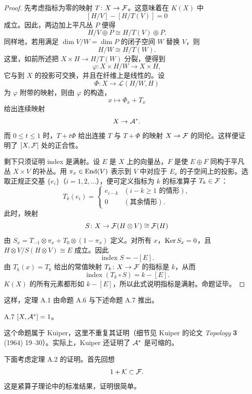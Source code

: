 \begin{proof}
  先考虑指标为零的映射 $T\colon X\to\mathcal{F}$。这意味着在 $K(X)$ 中
  \[
    [H/V]-[H/T(V)]=0
  \]
  成立。因此，两边加上平凡丛 $P$ 便得
  \[
    H/V\oplus P\cong H/T(V)\oplus P.
  \]
  同样地，若用满足 $\dim V/W=\dim P$ 的闭子空间 $W$ 替换 $V$，则
  \[
    H/W\cong H/T(W).
  \]
  这里，如前所述把 $X\times H\to H/T(W)$ 分裂，便得到
  \[
    \varphi\colon X\times H/W\to X\times H,
  \]
  它与到 $X$ 的投影可交换，并且在纤维上是线性的。设
  \[
    \Phi\colon X\to\mathcal L(H/W,H)
  \]
  为 $\varphi$ 附带的映射，则由 $\varphi$ 的构造，
  \[
    x\mapsto\Phi_x+T_x
  \]
  给出连续映射
  \[
    X\to\mathcal{A}^*.
  \]
  而 $0\le t\le1$ 时，$T+t\Phi$ 给出连接 $T$ 与 $T+\Phi$ 的映射 $X\to\mathcal{F}$ 的同伦。这样便证明了 $[X,\mathcal{F}]$ 处的正合性。

  剩下只须证明 index 是满射。设 $E$ 是 $X$ 上的向量丛，$F$ 是使 $E\oplus F$ 同构于平凡丛 $X\times V$ 的补丛。用 $\pi_x\in\operatorname{End}(V)$ 表示到 $V$ 中对应于 $E_x$ 的子空间上的投影。选取正规正交基 $\{e_i\}$（$i=1,2,\dots$），便可定义指标为 $k$ 的标准算子 $T_k\in\mathcal{F}$：
  \[
    T_k(e_i)=
    \begin{cases}
      e_{i-k} & (i-k\ge1\text{ 的情形}),\\
      0 & (\text{其余情形}).
    \end{cases}
  \]
  此时，映射
  \[
    S\colon X\to\mathcal{F}(H\otimes V)\cong\mathcal{F}(H)
  \]
  由 $S_x=T_{-1}\otimes\pi_x+T_0\otimes(1-\pi_x)$ 定义。对所有 $x$，$\operatorname{Ker} S_x=0$，且 $H\otimes V/S(H\otimes V)\cong E$ 成立。因此
  \[
    \operatorname{index}S=-[E].
  \]
  由 $T_k(x)=T_k$ 给出的常值映射 $T_k\colon X\to\mathcal{F}$ 的指标是 $k$，从而
  \[
    \operatorname{index}(T_k\circ S)=k-[E].
  \]
  $K(X)$ 的所有元素都形如 $k-[E]$，所以此式说明指标是满射。命题证毕。
\end{proof}

这样，定理 A.1 由命题 A.6 与下述命题 A.7 推出。

\begin{proposition*}{A.7}
  $[X,\mathcal{A}^*]=1$。
\end{proposition*}

这个命题属于 Kuiper，这里不重复其证明（细节见 Kuiper 的论文 \textit{Topology} \textbf{3} (1964) 19--30）。实际上，Kuiper 还证明了 $\mathcal{A}^*$ 是可缩的。


下面考虑定理 A.2 的证明。首先回想
\[
  1+\mathcal{K}\subset\mathcal{F}.
\]
这是紧算子理论中的标准结果，证明很简单。

